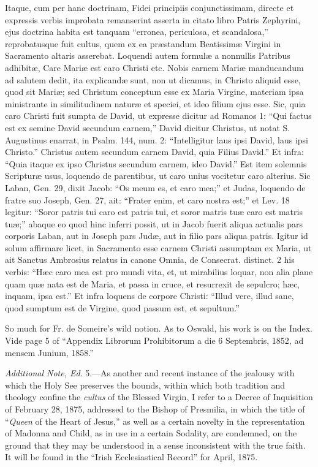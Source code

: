 Itaque, cum per hanc doctrinam, Fidei principiis conjunctissimam,
directe et expressis verbis improbata remanserint asserta in citato
libro Patris Zephyrini, ejus doctrina habita est tanquam ``erronea,
periculosa, et scandalosa,'' reprobatusque fuit cultus, quem ex ea
præstandum Beatissimæ Virgini in Sacramento altaris asserebat.
Loquendi autem formulæ a nonnullis Patribus adhibitæ, Care Mariæ est
caro Christi etc. Nobis carnem Mariæ manducandum ad salutem dedit, ita
explicandæ sunt, non ut dicamus, in Christo aliquid esse, quod sit
Mariæ; sed Christum conceptum esse ex Maria Virgine, materiam ipsa
ministrante in similitudinem naturæ et speciei, et ideo filium ejus
esse. Sic, quia caro Christi fuit sumpta de David, ut expresse dicitur
ad Romanos 1: ``Qui factus est ex semine David secundum carnem,''
David dicitur Christus, ut notat S. Augustinus enarrat, in Psalm. 144,
num. 2: ``Intelligitur laus ipsi David, laus ipsi Christo.''
Christus autem secundum carnem David, quia Filius David.'' Et infra:
``Quia itaque ex ipso Christus secundum carnem, ideo David.''
Est item solemnis Scripturæ usus, loquendo de parentibus, ut caro unius
vocitetur caro alterius. Sic Laban, Gen. 29, dixit Jacob: ``Os meum
es, et caro mea;'' et Judas, loquendo de fratre suo Joseph, Gen. 27,
ait: ``Frater enim, et caro nostra est;'' et Lev. 18 legitur:
``Soror patris tui caro est patris tui, et soror matris tuæ caro
est matris tuæ;'' abaque eo quod hinc inferri possit, ut in Jacob
fuerit aliqua actualis pars corporis Laban, aut in Joseph pars
Judæ, aut in filio pars aliqua patris. Igitur id solum affirmare licet,
in Sacramento esse carnem Christi assumptam ex Maria, ut ait Sanctus
Ambrosius relatus in canone Omnia, de Consecrat. distinct. 2 his verbis:
``Hæc caro mea est pro mundi vita, et, ut mirabilius loquar, non
alia plane quam quæ nata est de Maria, et passa in cruce, et resurrexit
de sepulcro; hæc, inquam, ipsa est.'' Et infra loquens de corpore
Christi: ``Illud vere, illud sane, quod sumptum est de Virgine, quod
passum est, et sepultum.''


So much for Fr. de Someire's wild notion. As to Oswald, his work is
on the Index. Vide page 5 of ``Appendix Librorum Prohibitorum a die
6 Septembris, 1852, ad mensem Junium, 1858.''


\emph{Additional Note, Ed}. 5.—As another and recent instance of the
jealousy with which the Holy See preserves the bounds, within which both
tradition and theology confine the \emph{cultus} of the Blessed Virgin,
I refer to a Decree of Inquisition of February 28, 1875, addressed to
the Bishop of Presmilia, in which the title of ``\emph{Queen} of the
Heart of Jesus,'' as well as a certain novelty in the representation
of Madonna and Child, as in use in a certain Sodality, are condemned, on
the ground that they may be understood in a sense inconsistent with the
true faith. It will be found in the ``Irish Ecclesiastical
Record'' for April, 1875.


